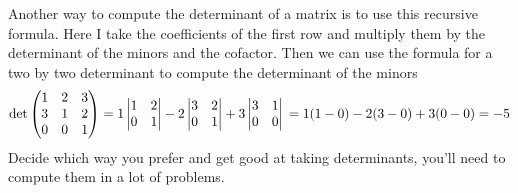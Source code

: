 {Another way to compute the determinant of a matrix is to use this recursive formula. Here I take the coefficients of the first row and multiply them by the determinant of the minors and the cofactor. Then we can use the formula for a two by two determinant to compute the determinant of the minors%
\[
\text{det}
\begin{pmatrix}
1 & 2 & 3 \\
3 & 1 & 2 \\
0 & 0 & 1 \\
\end{pmatrix}
= 1 
\begin{vmatrix}
1 & 2 \\
0 &1\\
\end{vmatrix} 
-2 
\begin{vmatrix}
3 & 2 \\
0 & 1 \\
\end{vmatrix} 
+ 3 
\begin{vmatrix}
3 & 1 \\
0 & 0 \\
\end{vmatrix}\\
 = 1(1-0) - 2(3-0) + 3(0-0) = -5
\]
Decide which way you prefer and get good at taking determinants, you'll need to compute them in a lot of problems.
}

